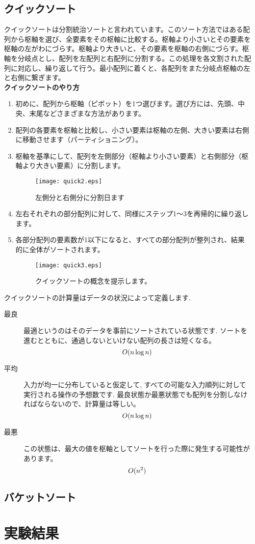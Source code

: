 \documentclass[a4j]{jarticle}
\begin{document}
\subsection{クイックソート}
クイックソートは分割統治ソートと言われています。このソート方法ではある配列から枢軸を選び、全要素をその枢軸に比較する。枢軸より小さいとその要素を枢軸の左がわにづらす。枢軸より大きいと、その要素を枢軸の右側にづらす。枢軸を分岐点とし、配列を左配列と右配列に分割する。この処理を各文割された配列に対応し、繰り返して行う。最小配列に着くと、各配列をまた分岐点枢軸の左と右側に繋ぎます。\\
\textbf{クイックソートのやり方}
\begin{enumerate}
  \item 初めに、配列から枢軸（ピボット）を1つ選びます。選び方には、先頭、中央、末尾などさまざまな方法があります。
  \item 配列の各要素を枢軸と比較し、小さい要素は枢軸の左側、大きい要素は右側に移動させます（パーティショニング）。
  \item 枢軸を基準にして、配列を左側部分（枢軸より小さい要素）と右側部分（枢軸より大きい要素）に分割します。
  \begin{figure}[H]
    \centering
    \texttt{[image: quick2.eps]}
    \caption{左側分と右側分に分割日ます}
  \end{figure}
  \newpage
  \item 左右それぞれの部分配列に対して、同様にステップ1～3を再帰的に繰り返します。
  \item 各部分配列の要素数が1以下になると、すべての部分配列が整列され、結果的に全体がソートされます。
  \begin{figure}[H]
    \centering
    \texttt{[image: quick3.eps]}
    \caption{クイックソートの概念を提示します。}
  \end{figure}
\end{enumerate}
クイックソートの計算量はデータの状況によって定義します. \\
\begin{description}
  \item[最良] 最適というのはそのデータを事前にソートされている状態です. ソートを進むとともに、通過しないといけない配列の長さは短くなる。
  \begin{equation}
    \centering
    O(n\log n)
  \end{equation}
  \item[平均] 入力が均一に分布していると仮定して, すべての可能な入力順列に対して実行される操作の予想数です. 最良状態か最悪状態でも配列を分割しなければならないので、計算量は等しい。
  \begin{equation}
    \centering
    O(n\log n)
  \end{equation}
  \item[最悪] この状態は、最大の値を枢軸としてソートを行った際に発生する可能性があります。
  \begin{equation}
    \centering
    O(n^2)
  \end{equation}
\end{description}
\subsection{バケットソート}


\section{実験結果}
\end{document}
